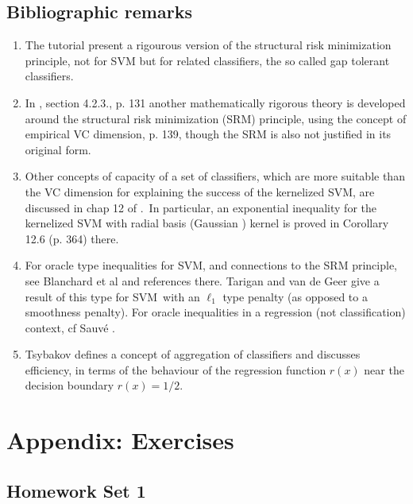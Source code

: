 \documentclass[11pt,twoside]{article}%
\theoremstyle{change}
\begin{document}
\subsection{Bibliographic remarks}

\begin{enumerate}
\item The tutorial \cite{Burg} present a rigourous version of the structural
risk minimization principle, not for SVM but for related classifiers, the so
called gap tolerant classifiers.

\item In \cite{Herb}, section 4.2.3., p. 131 another mathematically rigorous
theory is developed around the structural risk minimization (SRM) principle,
using the concept of empirical VC dimension, p. 139, though the SRM is also
not justified in its original form.

\item Other concepts of capacity of a set of classifiers, which are more
suitable than the VC dimension for explaining the success of the kernelized
SVM, are discussed in chap 12 of \cite{ScS}.\ In particular, an exponential
inequality for the kernelized SVM with radial basis (Gaussian ) kernel is
proved in Corollary 12.6 (p. 364) there.

\item For oracle type inequalities for SVM, and connections to the SRM
principle, see Blanchard et al \cite{blanchard-massart-svm} and references
there. Tarigan and van de Geer \cite{Tarig-van-deGeer} give a result of this
type for SVM\ with an $\ell_{1}$ type penalty (as opposed to a smoothness
penalty). For oracle inequalities in a regression (not classification)
context, cf Sauv\'{e} \cite{sauv}.

\item Tsybakov \cite{Tsyb-margin} defines a concept of aggregation of
classifiers and discusses efficiency, in terms of the behaviour of the
regression function $r(x)$ near the decision boundary $r(x)=1/2$.
\end{enumerate}

\newpage

\appendix


\section{Appendix: Exercises}

\subsection{Homework Set 1\textbf{\ }}
\end{document}
